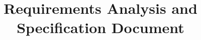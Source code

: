 \documentclass{report}
\begin{document}
\title{\textbf{R}equirements \textbf{A}nalysis and \textbf{S}pecification \textbf{D}ocument}
\maketitle

\tableofcontents




\end{document}
